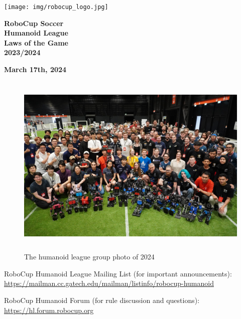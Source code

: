 \documentclass[a4paper]{article}
\title{}
\author{\rulesauthor}
\date{2022-06-11}
\begin{document}
    \sffamily

    \begin{center}
        \texttt{[image: img/robocup\_logo.jpg]}

        {\Huge \bfseries
        RoboCup Soccer
        \\
        Humanoid League
        \\
        Laws of the Game
        \\ \vspace{0.5cm}
        2023/2024}

        \bigskip

        {\bfseries March 17th, 2024}
    \end{center}

    \begin{figure}[!h]
        \centering
        \includegraphics[height=3.5in]{img/cover_2024.jpg}
        \captionsetup{labelformat=empty}
\caption{The humanoid league group photo of 2024}
    \end{figure}


    \bigskip
    RoboCup Humanoid League Mailing List (for important announcements):\\
    \url{https://mailman.cc.gatech.edu/mailman/listinfo/robocup-humanoid}

    \medskip
    RoboCup Humanoid Forum (for rule discussion and questions):\\
    \url{https://hl.forum.robocup.org}
\end{document}
